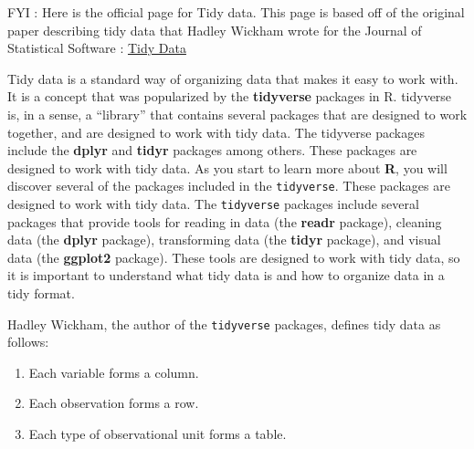 \documentclass[
  letterpaper,
  DIV=11,
  numbers=noendperiod]{scrreprt}
\providecommand{\tightlist}{%
  \setlength{\itemsep}{0pt}\setlength{\parskip}{0pt}}\usepackage{longtable,booktabs,array}
\begin{document}

\begin{tcolorbox}[enhanced jigsaw, opacitybacktitle=0.6, coltitle=black, colframe=quarto-callout-note-color-frame, colback=white, left=2mm, bottomtitle=1mm, breakable, leftrule=.75mm, arc=.35mm, toptitle=1mm, title=\textcolor{quarto-callout-note-color}{\faInfo}\hspace{0.5em}{Note}, opacityback=0, rightrule=.15mm, bottomrule=.15mm, titlerule=0mm, toprule=.15mm, colbacktitle=quarto-callout-note-color!10!white]

FYI : Here is the official page for Tidy data. This page is based off of
the original paper describing tidy data that Hadley Wickham wrote for
the Journal of Statistical Software :
\href{https://vita.had.co.nz/papers/tidy-data.pdf}{Tidy Data}

\end{tcolorbox}

Tidy data is a standard way of organizing data that makes it easy to
work with. It is a concept that was popularized by the
\textbf{tidyverse} packages in R. tidyverse is, in a sense, a
``library'' that contains several packages that are designed to work
together, and are designed to work with tidy data. The tidyverse
packages include the \textbf{dplyr} and \textbf{tidyr} packages among
others. These packages are designed to work with tidy data. As you start
to learn more about \textbf{R}, you will discover several of the
packages included in the \texttt{tidyverse}. These packages are designed
to work with tidy data. The \texttt{tidyverse} packages include several
packages that provide tools for reading in data (the \textbf{readr}
package), cleaning data (the \textbf{dplyr} package), transforming data
(the \textbf{tidyr} package), and visual data (the \textbf{ggplot2}
package). These tools are designed to work with tidy data, so it is
important to understand what tidy data is and how to organize data in a
tidy format.

Hadley Wickham, the author of the \texttt{tidyverse} packages, defines
tidy data as follows:

\begin{enumerate}
\def\labelenumi{\arabic{enumi}.}
\tightlist
\item
  Each variable forms a column.
\item
  Each observation forms a row.
\item
  Each type of observational unit forms a table.
\end{enumerate}
\end{document}
